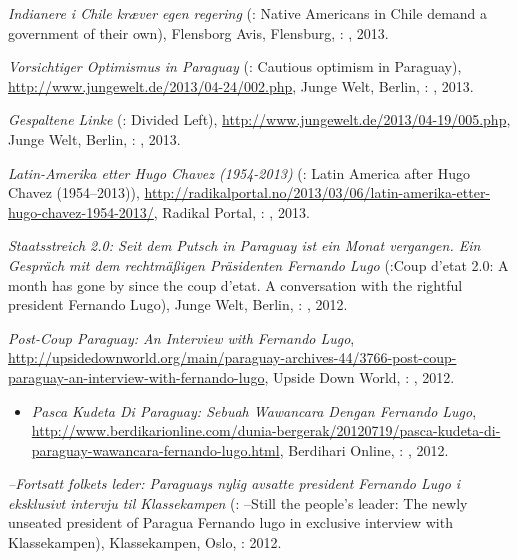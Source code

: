 \begin{itemize}
{\item \textit{Indianere i Chile kræver egen regering} (\english: Native Americans in Chile demand a government of their own), Flensborg Avis, Flensburg, \Germany: , 2013.
\item \textit{Vorsichtiger Optimismus in Paraguay} (\english: Cautious optimism in Paraguay), \href{http://www.jungewelt.de/2013/04-24/002.php}{http://www.jungewelt.de/2013/04-24/002.php}, Junge Welt, Berlin, \Germany: , 2013.
\item \textit{Gespaltene Linke} (\english: Divided Left), \href{http://www.jungewelt.de/2013/04-19/005.php}{http://www.jungewelt.de/2013/04-19/005.php}, Junge Welt, Berlin, \Germany: , 2013.
\item \textit{Latin-Amerika etter Hugo Chavez (1954-2013)} (\english: Latin America after Hugo Chavez (1954--2013)), \href{http://radikalportal.no/2013/03/06/latin-amerika-etter-hugo-chavez-1954-2013/}{http://radikalportal.no/2013/03/06/latin-amerika-etter-hugo-chavez-1954-2013/}, Radikal Portal, \Norway: , 2013.
\item \textit{Staatsstreich 2.0: Seit dem Putsch in Paraguay ist ein Monat vergangen. Ein Gespräch mit dem rechtmäßigen Präsidenten Fernando Lugo} (\english:Coup d'etat 2.0: A month has gone by since the coup d'etat. A conversation with the rightful president Fernando Lugo), Junge Welt, Berlin, \Germany: , 2012.
\item \textit{Post-Coup Paraguay: An Interview with Fernando Lugo}, \href{http://upsidedownworld.org/main/paraguay-archives-44/3766-post-coup-paraguay-an-interview-with-fernando-lugo}{http://upsidedownworld.org/main/paraguay-archives-44/3766-post-coup-paraguay-an-interview-with-fernando-lugo}, Upside Down World, \USA: , 2012.
    \begin{itemize}
    \item \translatedversion \malay \textit{Pasca Kudeta Di Paraguay: Sebuah Wawancara Dengan Fernando Lugo}, \href{http://www.berdikarionline.com/dunia-bergerak/20120719/pasca-kudeta-di-paraguay-wawancara-fernando-lugo.html}{http://www.berdikarionline.com/dunia-bergerak/20120719/pasca-kudeta-di-paraguay-wawancara-fernando-lugo.html}, Berdihari Online, \Indonesia: , 2012.
    \end{itemize}
\item \textit{--Fortsatt folkets leder: Paraguays nylig avsatte president Fernando Lugo i eksklusivt intervju til Klassekampen} (\english: --Still the people's leader: The newly unseated president of Paragua Fernando lugo in exclusive interview with Klassekampen), Klassekampen, Oslo, \Norway:  2012.
}
\end{itemize}
